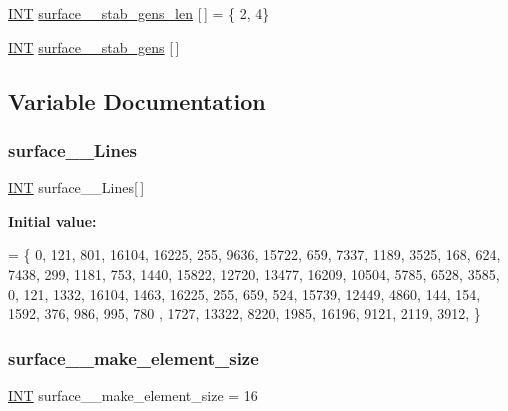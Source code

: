 \begin{DoxyCompactItemize}
\item 
\mbox{\hyperlink{galois_8h_a09fddde158a3a20bd2dcadb609de11dc}{I\+NT}} \mbox{\hyperlink{surface__11_8_c_a3b4166fc87da24a5ff95b02c1e434d6a}{surface\+\_\+\_\+stab\+\_\+gens\+\_\+len}} \mbox{[}$\,$\mbox{]} = \{ 2, 4\}
\item 
\mbox{\hyperlink{galois_8h_a09fddde158a3a20bd2dcadb609de11dc}{I\+NT}} \mbox{\hyperlink{surface__11_8_c_a852ec407f354c39e2232c972b3af24fd}{surface\+\_\+\_\+stab\+\_\+gens}} \mbox{[}$\,$\mbox{]}
\end{DoxyCompactItemize}


\subsection{Variable Documentation}
\mbox{\label{surface__11_8_c_ae63188ef22dd753789e5a20a0b9cb8f6}} 
\subsubsection{\texorpdfstring{surface\+\_\+\_\+\+Lines}{surface\_11\_Lines}}
{\footnotesize\ttfamily \mbox{\hyperlink{galois_8h_a09fddde158a3a20bd2dcadb609de11dc}{I\+NT}} surface\+\_\+\_\+\+Lines\mbox{[}$\,$\mbox{]}}

{\bfseries Initial value\+:}
\begin{DoxyCode}
= \{ 
    0, 121, 801, 16104, 16225, 255, 9636, 15722, 659, 7337, 1189, 3525, 168, 624, 7438, 299, 1181, 753, 
      1440, 15822, 12720, 13477, 16209, 10504, 5785, 6528, 3585, 
    0, 121, 1332, 16104, 1463, 16225, 255, 659, 524, 15739, 12449, 4860, 144, 154, 1592, 376, 986, 995, 780
      , 1727, 13322, 8220, 1985, 16196, 9121, 2119, 3912, 
\}
\end{DoxyCode}
\mbox{\label{surface__11_8_c_a0cecdcef2079d6dccd264005894930e7}} 
\subsubsection{\texorpdfstring{surface\+\_\+\_\+make\+\_\+element\+\_\+size}{surface\_11\_make\_element\_size}}
{\footnotesize\ttfamily \mbox{\hyperlink{galois_8h_a09fddde158a3a20bd2dcadb609de11dc}{I\+NT}} surface\+\_\+\_\+make\+\_\+element\+\_\+size = 16}

